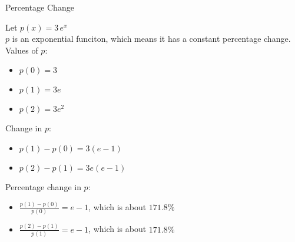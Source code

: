 \documentclass{ximera}
\begin{document}
\begin{example} Percentage Change



Let $p(x) = 3 \, e^x$ \\

$p$ is an exponential funciton, which means it has a constant percentage change. \\

Values of $p$:

\begin{itemize}
\item $p(0) = 3$

\item $p(1) = 3 e$

\item $p(2) = 3 e^2$
\end{itemize}



Change in $p$:

\begin{itemize}
\item $p(1) - p(0) = 3 (e-1)$

\item $p(2) - p(1) = 3 e (e-1)$

\end{itemize}





Percentage change in $p$:

\begin{itemize}
\item $\frac{p(1) - p(0)}{p(0)} = e - 1$, which is about $171.8\%$

\item $\frac{p(2) - p(1)}{p(1)} = e-1 $, which is about $171.8\%$

\end{itemize}


\end{example}
\end{document}
